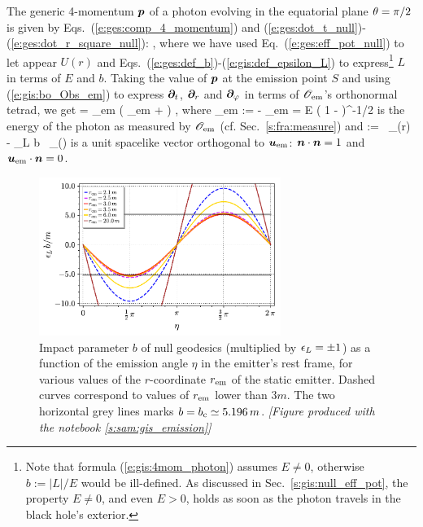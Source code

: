 The generic 4-momentum $\bm{p}$ of a photon evolving in the equatorial
plane $\theta=\pi/2$ is given by Eqs.~(\ref{e:ges:comp_4_momentum}) and
(\ref{e:ges:dot_t_null})-(\ref{e:ges:dot_r_square_null}):
\be \label{e:gis:4mom_photon}
   ,
\ee
where we have used Eq.~(\ref{e:ges:eff_pot_null}) to let appear $U(r)$
and Eqs.~(\ref{e:ges:def_b})-(\ref{e:gis:def_epsilon_L}) to express\footnote{
Note that formula (\ref{e:gis:4mom_photon}) assumes $E\neq 0$, otherwise $b := |L|/E$ would
be ill-defined. As discussed in Sec.~\ref{s:gis:null_eff_pot}, the property $E\neq 0$,
and even $E>0$, holds as soon as the photon travels in the black hole's exterior.}
$L$ in terms of $E$ and $b$.
Taking the value of $\bm{p}$ at the emission point $S$ and using (\ref{e:gis:bo_Obs_em})
to express $\bm{\partial}_t$, $\bm{\partial}_r$ and $\bm{\partial}_\varphi$ in terms of
$\mathscr{O}_{\rm em}$'s orthonormal tetrad, we get
\be \label{e:gis:p_eps_u_em_n}
     = \veps_{\rm em} \left( _{\rm em} +  \right) ,
\ee
where
\be
    \veps_{\rm em} := - _{\rm em} \cdot {} =
        E \left( 1 -  \right)^{-1/2}
\ee
is the energy of the photon as measured by $\mathscr{O}_{\rm em}$ (cf. Sec.~\ref{s:fra:measure})
and
\be \label{e:gis:n_b_U_rS}
     := \pm {} \, _{(r)}
    - \eps_L b \, _{(\ph)}
\ee
is a unit spacelike vector orthogonal to $\bm{u}_{\rm em}$:
$\bm{n}\cdot\bm{n} = 1$ and $\bm{u}_{\rm em}\cdot\bm{n} = 0$.

\begin{figure}
\centerline{\includegraphics[width=0.7\textwidth]{gis_b_eta.pdf}}
\caption[]{\label{f:gis:b_eta} \footnotesize
Impact parameter $b$ of null geodesics (multiplied by $\epsilon_L=\pm 1$)
as a function of the emission angle $\eta$ in the
emitter's rest frame, for various values of the $r$-coordinate $r_{\rm em}$ of the
static emitter. Dashed curves correspond to values of $r_{\rm em}$ lower than $3 m$.
The two horizontal grey lines marks $b = b_{\rm c} \simeq 5.196\, m$.
\textsl{[Figure produced with the notebook \ref{s:sam:gis_emission}]}
}
\end{figure}

